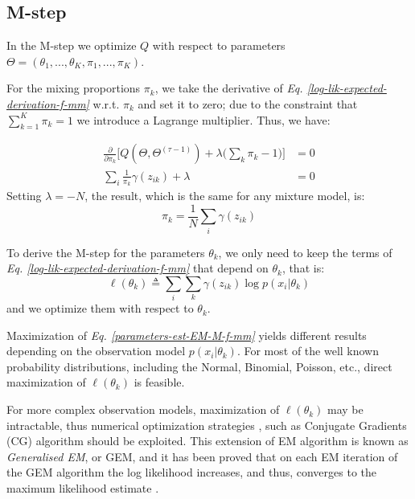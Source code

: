 \subsection*{M-step}
In the M-step we optimize $Q$ with respect to parameters $\Theta = (\theta_{1},...,\theta_{K},\pi_{1},...,\pi_{K})$.

For the mixing proportions $\pi_{k}$, we take the derivative of \emph{Eq. \ref{log-lik-expected-derivation-f-mm}} w.r.t. $\pi_{k}$ and set it to zero; due to the constraint that $\sum_{k=1}^{K}\pi_{k} = 1$ we introduce a Lagrange multiplier. Thus, we have:

\begin{equation} \label{derivative-mix-prop-f-mm}
  \begin{aligned}
	\frac{\partial}{\partial \pi_{k}} \bigg[  Q(\Theta, \Theta^{(\tau-1)}) + \lambda \big( \sum_{k}\pi_{k} - 1\big) \bigg] & = 0 \\
	\sum_{i} \frac{1}{\pi_{k}} \gamma(z_{ik}) + \lambda & = 0 
  \end{aligned}
\end{equation}
Setting $\lambda = - N$, the result, which is the same for any mixture model, is:
\begin{equation} \label{mixing-proportions-est-f-mm}
		\pi_{k} = \frac{1}{N} \sum_{i} \gamma(z_{ik})
\end{equation}

To derive the M-step for the parameters $\theta_{k}$, we only need to keep the terms of \emph{Eq. \ref{log-lik-expected-derivation-f-mm}} that depend on $\theta_{k}$, that is:
\begin{equation} \label{parameters-est-EM-M-f-mm}
		\ell(\theta_{k}) \triangleq \sum_{i} \sum_{k} \gamma(z_{ik}) \log p(x_{i}|\theta_{k})
\end{equation}
and we optimize them with respect to $\theta_{k}$.

Maximization of \emph{Eq. \ref{parameters-est-EM-M-f-mm}} yields different results depending on the observation model $p(x_{i}|\theta_{k})$. For most of the well known probability distributions, including the Normal, Binomial, Poisson, etc., direct maximization of $\ell(\theta_{k})$ is feasible. 

For more complex observation models, maximization of $\ell(\theta_{k})$ may be intractable, thus numerical optimization strategies \citep{Nocedal2006}, such as Conjugate Gradients (CG) algorithm \citep{Hestenes1952} should be exploited. This extension of EM algorithm is known as \emph{Generalised EM}, or GEM, and it has been proved that on each EM iteration of the GEM algorithm the log likelihood increases, and thus, converges to the maximum likelihood estimate \citep{Wu1983}.